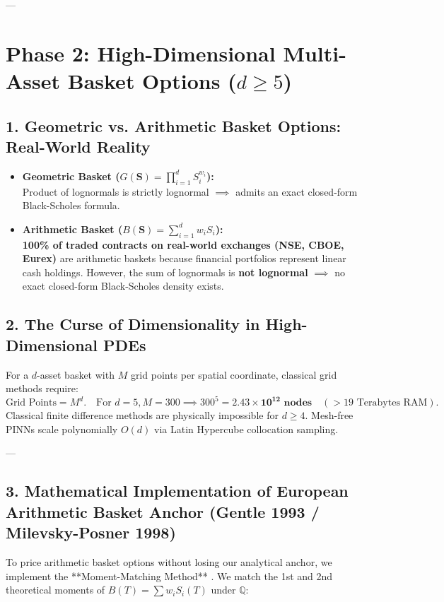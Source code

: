 \documentclass[11pt,a4paper]{article}
\begin{document}
---

\section{Phase 2: High-Dimensional Multi-Asset Basket Options ($d \ge 5$)}

\subsection{1. Geometric vs. Arithmetic Basket Options: Real-World Reality}
\begin{itemize}[leftmargin=1.5em]
    \item \textbf{Geometric Basket ($G(\mathbf{S}) = \prod_{i=1}^d S_i^{w_i}$):} \\
    Product of lognormals is strictly lognormal $\implies$ admits an exact closed-form Black-Scholes formula.
    \item \textbf{Arithmetic Basket ($B(\mathbf{S}) = \sum_{i=1}^d w_i S_i$):} \\
    \textbf{100\% of traded contracts on real-world exchanges (NSE, CBOE, Eurex)} are arithmetic baskets because financial portfolios represent linear cash holdings. However, the sum of lognormals is \textbf{not lognormal} $\implies$ no exact closed-form Black-Scholes density exists.
\end{itemize}

\subsection{2. The Curse of Dimensionality in High-Dimensional PDEs}
For a $d$-asset basket with $M$ grid points per spatial coordinate, classical grid methods require:
\begin{equation}
    \text{Grid Points} = M^d. \quad \text{For } d=5, M=300 \implies 300^5 = \mathbf{2.43 \times 10^{12} \text{ nodes}} \quad (> 19 \text{ Terabytes RAM}).
\end{equation}
Classical finite difference methods are physically impossible for $d \ge 4$. Mesh-free PINNs scale polynomially $O(d)$ via Latin Hypercube collocation sampling.

---

\subsection{3. Mathematical Implementation of European Arithmetic Basket Anchor (Gentle 1993 / Milevsky-Posner 1998)}
To price arithmetic basket options without losing our analytical anchor, we implement the **Moment-Matching Method** \cite{gentle1993basket, milevsky1998valuing}. We match the 1st and 2nd theoretical moments of $B(T) = \sum w_i S_i(T)$ under $\mathbb{Q}$:
\end{document}
